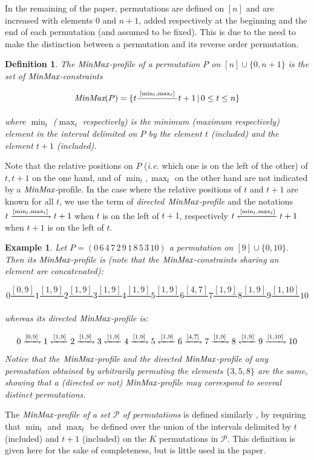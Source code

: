\documentclass{article}
\newcommand{\M}{\mbox{\it MinMax}}
\newcommand{\PK}{\mathcal P}
\newcommand{\n}{[n]}
\newcommand{\rf}[1]{\xrightharpoondown{#1}}
\newcommand{\lf}[1]{\xleftharpoondown{#1}}
\newtheorem{defin}{Definition}
\newtheorem{ex}{Example}
\newcommand{\bdefin}{\begin{defin}\rm}
\newcommand{\edefin}{\end{defin} }
\newcommand{\bex}{\begin{ex}\rm}
\newcommand{\eex}{\end{ex}}
\begin{document}
In the remaining of the paper, permutations are defined on $\n$ and are increased with elements $0$ and $n+1$,
added respectively at the beginning and the end of each permutation (and assumed to be fixed). This is due to the need 
to make the distinction between a permutation and its reverse order permutation. 

\bdefin \cite{IR}
The {\em $\M$-profile of a permutation} $P$ on $\n\cup\{0,n+1\}$ is the set of {\em $\M$-constraints}

$$\M(P)=\{t\frac{\hspace*{0.1cm}{\scriptstyle [\min _t, \max _t]}\hspace*{0.1cm}}{} t+1\, |\, 0\leq t\leq n\}$$

\noindent where $\min_t$ ($\max_t$ respectively) is the minimum (maximum respectively) element  
in the interval delimited on $P$ by the element $t$ (included) and the element $t+1$ (included). 

\edefin

Note that the relative positions on $P$ ({\em i.e.} which one is on the left of the other) of $t, t+1$ on the one hand, and of  $\min_t,\max_t$ on the other hand are not indicated by a $\M$-profile.
In the case where the relative positions of $t$ and $t+1$  are
known for all $t$, we use the term of {\em directed $\M$-profile} and the notations
$t\rf{[\min _t, \max _t]} t+1$ when $t$ is on the left of $t+1$,
respectively  $t\lf{[\min _t, \max _t]} t+1$ when $t+1$ is on the left of $t$.

\bex
Let $P=(0\, 6\, 4\, 7\, 2\, 9\, 1\, 8\, 5\, 3\, 10)$ a permutation on $[9]\cup\{0,10\}$. Then its
$\M$-profile is (note that the $\M$-constraints sharing an element are concatenated): 


$$0\frac{\scriptstyle{[0, 9]}}{} 1\frac{\scriptstyle{[1, 9]}}{}2\frac{\scriptstyle{[1, 9]}}{}3\frac{\scriptstyle{[1, 9]}}{}4\frac{\scriptstyle{[1,9]}}{}5\frac{\scriptstyle{[1, 9]}}{}6\frac{\scriptstyle{[4, 7]}}{}7\frac{\scriptstyle{[1, 9]}}{}8\frac{\scriptstyle{[1, 9]}}{}9\frac{\scriptstyle{[1, 10]}}{}10$$

\noindent whereas its directed $\M$-profile is:

$$0\rf{[0, 9]} 1\lf{[1, 9]}2\rf{[1, 9]}3\lf{[1, 9]}4\rf{[1,9]}5\lf{[1, 9]}6\rf{[4, 7]}7\rf{[1, 9]}8\lf{[1, 9]}9\rf{[1, 10]}10$$

\noindent Notice that the $\M$-profile and the directed $\M$-profile of any permutation obtained by 
arbitrarily permuting the elements $\{3,5,8\}$ are the same, showing that a (directed or not) $\M$-profile
may correspond to several distinct permutations. 
\eex
The {\em $\M$-profile of a set $\PK$ of permutations} is defined similarly \cite{IR}, by requiring that $\min_t$ 
and $\max_t$ be defined over the union of the intervals delimited by $t$ (included) and $t+1$ (included)
on the $K$ permutations in $\PK$. This definition is given here for the sake of completeness,
but is little used in the paper.
\end{document}
